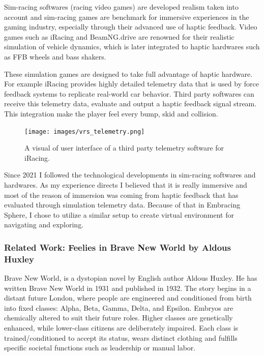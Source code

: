                 Sim-racing softwares (racing video games) are developed realism taken into account and sim-racing games are benchmark for immersive experiences in the gaming industry, especially through their advanced use of haptic feedback. Video games such as iRacing and BeamNG.drive are renowned for their realistic simulation of vehicle dynamics, which is later integrated to haptic hardwares such as FFB wheels and bass shakers.\par

                These simulation games are designed to take full advantage of haptic hardware. For example iRacing provides highly detailed telemetry data that is used by force feedback systems to replicate real-world car behavior. Third party softwares can receive this telemetry data, evaluate and output a haptic feedback signal stream. This integration make the player feel every bump, skid and collision.\par

                \begin{figure}[H]
                    \centering
                    \texttt{[image: images/vrs\_telemetry.png]}
                    \caption{A visual of user interface of a third party telemetry software for iRacing.}
                    \label{fig:VRS}
                \end{figure}

                Since 2021 I followed the technological developments in sim-racing softwares and hardwares. As my experience directs I believed that it is really immersive and most of the reason of immersion was coming from haptic feedback that has evaluated through simulation telemetry data. Because of that in Embracing Sphere, I chose to utilize a similar setup to create virtual environment for navigating and exploring.\par
            \subsubsection{Related Work: Feelies in Brave New World by Aldous Huxley}    
                Brave New World, is a dystopian novel by English author Aldous Huxley. He has written Brave New World in 1931 and published in 1932\cite{Brave_New_World}. The story begins in a distant future London, where people are engineered and conditioned from birth into fixed classes: Alpha, Beta, Gamma, Delta, and Epsilon. Embryos are chemically altered to suit their future roles. Higher classes are genetically enhanced, while lower-class citizens are deliberately impaired. Each class is trained/conditioned to accept its status, wears distinct clothing and fulfills specific societal functions such as leadership or manual labor.\par

